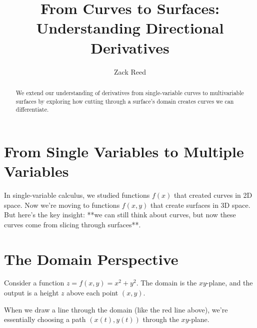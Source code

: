 \documentclass{ximera}
\title{From Curves to Surfaces: Understanding Directional Derivatives}
\author{Zack Reed}
\begin{document}
\begin{abstract}
We extend our understanding of derivatives from single-variable curves to multivariable surfaces by exploring how cutting through a surface's domain creates curves we can differentiate.
\end{abstract}
\maketitle

\section{From Single Variables to Multiple Variables}

In single-variable calculus, we studied functions $f(x)$ that created curves in 2D space. Now we're moving to functions $f(x,y)$ that create surfaces in 3D space. But here's the key insight: **we can still think about curves, but now these curves come from slicing through surfaces**.

\section{The Domain Perspective}

Consider a function $z = f(x,y) = x^2 + y^2$. The domain is the $xy$-plane, and the output is a height $z$ above each point $(x,y)$.


When we draw a line through the domain (like the red line above), we're essentially choosing a path $(x(t), y(t))$ through the $xy$-plane.
\end{document}
